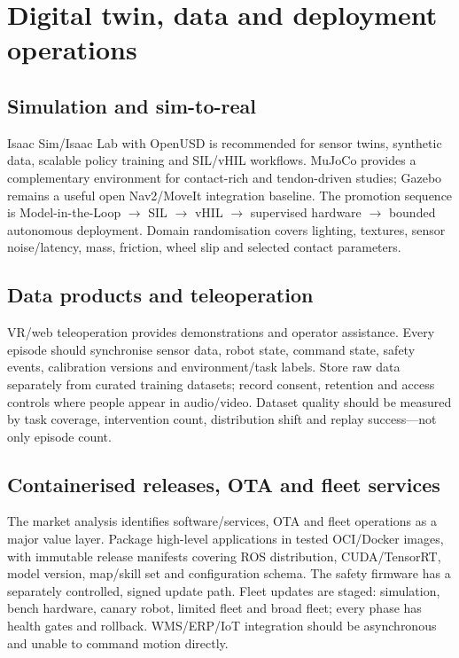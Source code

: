 \documentclass[10pt,a4paper]{article}
\begin{document}
\section{Digital twin, data and deployment operations}
\subsection{Simulation and sim-to-real}
Isaac Sim/Isaac Lab with OpenUSD is recommended for sensor twins, synthetic data, scalable policy training and SIL/vHIL workflows. MuJoCo provides a complementary environment for contact-rich and tendon-driven studies; Gazebo remains a useful open Nav2/MoveIt integration baseline. The promotion sequence is Model-in-the-Loop $\rightarrow$ SIL $\rightarrow$ vHIL $\rightarrow$ supervised hardware $\rightarrow$ bounded autonomous deployment. Domain randomisation covers lighting, textures, sensor noise/latency, mass, friction, wheel slip and selected contact parameters.\cite{isaac,isaaclab,mujoco,gazebo}

\subsection{Data products and teleoperation}
VR/web teleoperation provides demonstrations and operator assistance. Every episode should synchronise sensor data, robot state, command state, safety events, calibration versions and environment/task labels. Store raw data separately from curated training datasets; record consent, retention and access controls where people appear in audio/video. Dataset quality should be measured by task coverage, intervention count, distribution shift and replay success---not only episode count.

\subsection{Containerised releases, OTA and fleet services}
The market analysis identifies software/services, OTA and fleet operations as a major value layer. Package high-level applications in tested OCI/Docker images, with immutable release manifests covering ROS distribution, CUDA/TensorRT, model version, map/skill set and configuration schema. The safety firmware has a separately controlled, signed update path. Fleet updates are staged: simulation, bench hardware, canary robot, limited fleet and broad fleet; every phase has health gates and rollback. WMS/ERP/IoT integration should be asynchronous and unable to command motion directly.
\end{document}
